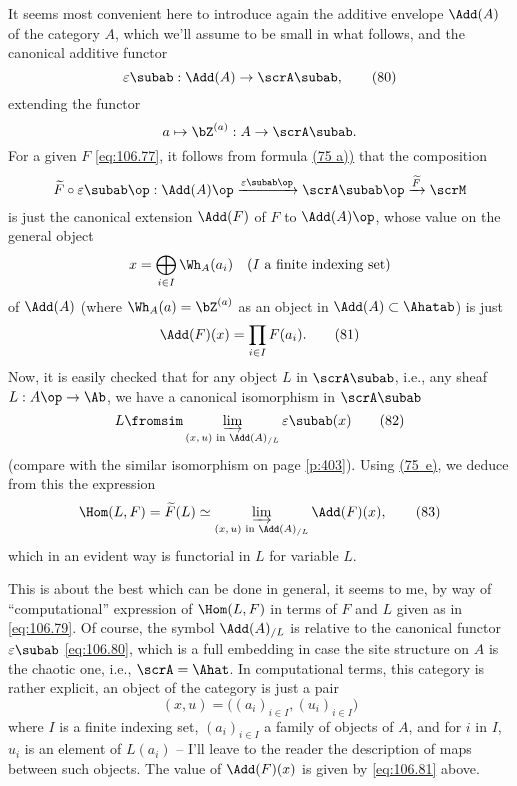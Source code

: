 It seems most convenient here to introduce again the additive envelope
$\Add(A)$ of the category $A$, which we'll assume to be small in what
follows, and the canonical additive functor
\begin{equation}
  \label{eq:106.80}
  \varepsilon\subab:\Add(A)\to\scrA\subab,\tag{80}
\end{equation}
extending the functor
\[a\mapsto\bZ^{(a)}:A\to\scrA\subab.\]
For a given $F$ \eqref{eq:106.77}, it follows from formula
\hyperref[eq:106.75]{(75 a))} that the composition
\[\widetilde F\circ\varepsilon\subab\op:\Add(A)\op
\xrightarrow{\varepsilon\subab\op} {\scrA\subab}\op
\xrightarrow{\widetilde F} \scrM\]
is just the canonical extension $\Add(F)$ of $F$ to $\Add(A)\op$,
whose value on the general object
\[x = \bigoplus_{i\in I} \Wh_A(a_i)\quad
\text{($I$ a finite indexing set)}\]
of $\Add(A)$ (where $\Wh_A(a)=\bZ^{(a)}$ as an object in
$\Add(A)\subset\Ahatab$) is just
\begin{equation}
  \label{eq:106.81}
  \Add(F)(x)=\prod_{i\in I}F(a_i).\tag{81}
\end{equation}
Now, it is easily checked that for any object $L$ in $\scrA\subab$,
i.e., any sheaf $L:A\op\to\Ab$, we have a canonical isomorphism in
$\scrA\subab$
\begin{equation}
  \label{eq:106.82}
  L\fromsim \varinjlim_{\text{$(x,u)$ in $\Add(A)_{/L}$}} \varepsilon\subab(x)\tag{82}
\end{equation}
(compare with the similar isomorphism on page \ref{p:403}). Using
\hyperref[eq:106.75]{(75~e)}, we deduce from this the
expression
\begin{equation}
  \label{eq:106.83}
  \Hom(L,F)=\widetilde F(L)\simeq \varinjlim_{\text{$(x,u)$ in
      $\Add(A)_{/L}$}} \Add(F)(x),\tag{83}
\end{equation}
which in an evident way is functorial in $L$ for variable $L$.

This is about the best which can be done in general, it seems to me,
by way of ``computational'' expression of $\Hom(L,F)$ in terms of $F$
and $L$ given as in \eqref{eq:106.79}. Of course, the symbol
$\Add(A)_{/L}$ is relative to the canonical functor
$\varepsilon\subab$ \eqref{eq:106.80}, which is a full embedding in
case the site structure on $A$ is the chaotic one, i.e.,
$\scrA=\Ahat$. In computational terms, this category is rather
explicit, an object of the category is just a pair
\[(x,u)=\bigl((a_i)_{i\in I}, (u_i)_{i\in I}\bigr)\]
where $I$ is a finite indexing set, $(a_i)_{i\in I}$ a family of
objects of $A$, and for $i$ in $I$, $u_i$ is an element of $L(a_i)$ --
I'll leave to the reader the description of maps between such
objects. The value of $\Add(F)(x)$ is given by \eqref{eq:106.81}
above.

